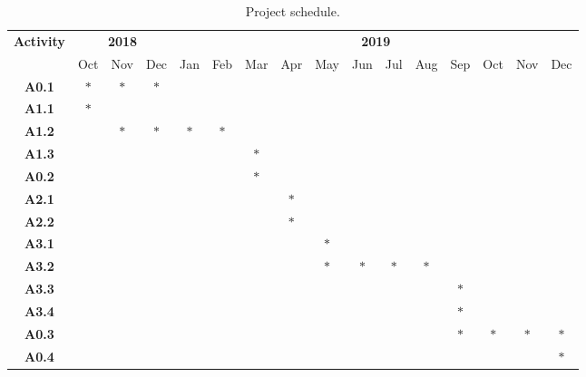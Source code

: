 \documentclass[12pt]{article}
\begin{document}
\begin{table}[H]
\centering
\caption{\small Project schedule.}
\scriptsize
\begin{tabular}{|c|c|c|c|c|c|c|c|c|c|c|c|c|c|c|c|}
	\hline
    \multirow{2}{*}{\textbf{Activity}}
        & \multicolumn{3}{|c|}{\textbf{2018}} & \multicolumn{12}{|c|}{\textbf{2019}}\\
    \cline{2-16}
                  & Oct & Nov & Dec & Jan & Feb & Mar & Apr & May & Jun & Jul & Aug & Sep & Oct & Nov & Dec\\
    \hline
    \textbf{A0.1} & $*$ & $*$ & $*$ &     &     &     &     &     &     &     &     &     &     &     &     \\
    \hline
    \textbf{A1.1} & $*$ &     &     &     &     &     &     &     &     &     &     &     &     &     &     \\
    \hline
    \textbf{A1.2} &     & $*$ & $*$ & $*$ & $*$ &     &     &     &     &     &     &     &     &     &     \\
    \hline
    \textbf{A1.3} &     &     &     &     &     & $*$ &     &     &     &     &     &     &     &     &     \\
    \hline
    \textbf{A0.2} &     &     &     &     &     & $*$ &     &     &     &     &     &     &     &     &     \\
    \hline
    \textbf{A2.1} &     &     &     &     &     &     & $*$ &     &     &     &     &     &     &     &     \\
    \hline
    \textbf{A2.2} &     &     &     &     &     &     & $*$ &     &     &     &     &     &     &     &     \\
    \hline
    \textbf{A3.1} &     &     &     &     &     &     &     & $*$ &     &     &     &     &     &     &     \\
    \hline
    \textbf{A3.2} &     &     &     &     &     &     &     & $*$ & $*$ & $*$ & $*$ &     &     &     &     \\
    \hline
    \textbf{A3.3} &     &     &     &     &     &     &     &     &     &     &     & $*$ &     &     &     \\
    \hline
    \textbf{A3.4} &     &     &     &     &     &     &     &     &     &     &     & $*$ &     &     &     \\
    \hline
    \textbf{A0.3} &     &     &     &     &     &     &     &     &     &     &     & $*$ & $*$ & $*$ & $*$ \\
    \hline
    \textbf{A0.4} &     &     &     &     &     &     &     &     &     &     &     &     &     &     & $*$ \\
    \hline
\end{tabular}
\label{table:sched}
\end{table}
\end{document}
